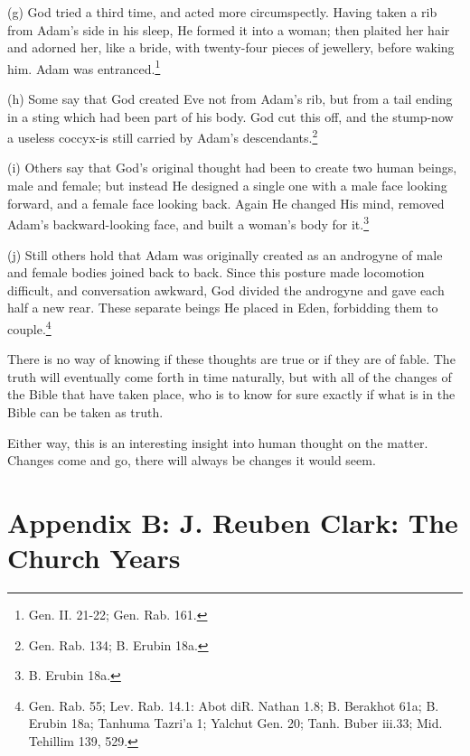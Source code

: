 \documentclass{article}
\begin{document}
(g) God tried a third time, and acted more circumspectly. Having
taken a rib from Adam's side in his sleep, He formed it into a
woman; then plaited her hair and adorned her, like a bride, with
twenty-four pieces of jewellery, before waking him. Adam was
entranced.\footnote{Gen. II. 21-22; Gen. Rab. 161.}

(h) Some say that God created Eve not from Adam's rib, but from a
tail ending in a sting which had been part of his body. God cut
this off, and the stump-now a useless coccyx-is still carried by
Adam's descendants.\footnote{Gen. Rab. 134; B. Erubin 18a.}

(i) Others say that God's original thought had been to create two
human beings, male and female; but instead He designed a single
one with a male face looking forward, and a female face looking
back. Again He changed His mind, removed Adam's backward-looking
face, and built a woman's body for it.\footnote{B. Erubin 18a.}

 (j) Still others hold that Adam was originally created as an
androgyne of male and female bodies joined back to back. Since
this posture made locomotion difficult, and conversation awkward,
God divided the androgyne and gave each half a new rear. These
separate beings He placed in Eden, forbidding them to 
couple.\footnote{Gen. Rab. 55; Lev. Rab. 14.1: Abot diR. Nathan 1.8; B.
Berakhot 61a; B. Erubin 18a; Tanhuma Tazri'a 1; Yalchut Gen. 20;
Tanh. Buber iii.33; Mid. Tehillim 139, 529.}

There is no way of knowing if these thoughts are true or if they are of fable.
The truth will eventually come forth in time naturally, but with all of the
changes of the Bible that have taken place, who is to know for sure exactly if
what is in the Bible can be taken as truth.

Either way, this is an interesting insight into human thought on the matter.
Changes come and go, there will always be changes it would seem.

\newpage

\section{Appendix B: J. Reuben Clark: The Church Years}
\end{document}
